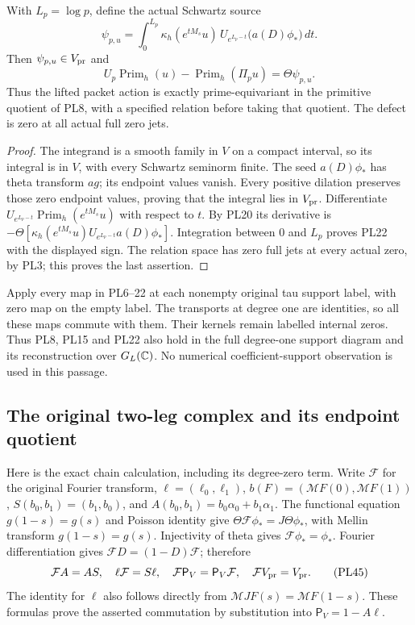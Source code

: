 \begin{theorem}
\label{pl:thm:prime}
With \(L_p=\log p\), define the actual Schwartz source
\[
 \psi_{p,u}=
 \int_0^{L_p}\kappa_h(e^{tM_s}u)\,
       U_{e^{L_p-t}}\bigl(a(D)\phi_*\bigr)\,dt.
 \tag{PL21}\label{pl:pl:duhamel}
\]
Then \(\psi_{p,u}\in V_{\rm pr}\) and
\[
 U_p\operatorname{Prim}_h(u)-\operatorname{Prim}_h(\Pi_pu)
                =\Theta\psi_{p,u}.
 \tag{PL22}\label{pl:pl:prime-defect}
\]
Thus the lifted packet action is exactly prime-equivariant in the
primitive quotient of PL8, with a specified relation before taking
that quotient. The defect is zero at all actual full zero jets.
\end{theorem}
\begin{proof}
The integrand is a smooth family in \(V\) on a compact interval,
so its integral is in \(V\), with every Schwartz seminorm finite.
The seed \(a(D)\phi_*\) has theta transform \(a g\); its endpoint
values vanish. Every positive dilation preserves those zero endpoint
values, proving that the integral lies in \(V_{\rm pr}\).
Differentiate
\(U_{e^{L_p-t}}\operatorname{Prim}_h(e^{tM_s}u)\)
with respect to \(t\). By PL20 its derivative is
\(-\Theta[\kappa_h(e^{tM_s}u)U_{e^{L_p-t}}a(D)\phi_*]\).
Integration between \(0\) and \(L_p\) proves PL22 with the
displayed sign. The relation space has zero full jets at every
actual zero, by PL3; this proves the last assertion.
\end{proof}

Apply every map in PL6--22 at each nonempty original tau support label,
with zero map on the empty label. The transports at degree one are
identities, so all these maps commute with them. Their kernels remain
labelled internal zeros. Thus PL8, PL15 and PL22 also hold in the full
degree-one support diagram and its reconstruction over \(G_L(\mathbb C)\).
No numerical coefficient-support observation is used in this passage.

\subsection{The original two-leg complex and its endpoint quotient}
Here is the exact chain calculation, including its degree-zero term.
Write \(\mathcal F\) for the original Fourier transform,
\(\ell=(\ell_0,\ell_1)\), \(b(F)=(\mathcal M F(0),\mathcal M F(1))\),
\(S(b_0,b_1)=(b_1,b_0)\), and
\(A(b_0,b_1)=b_0\alpha_0+b_1\alpha_1\).
The functional equation \(g(1-s)=g(s)\) and Poisson identity give
\(\Theta\mathcal F\phi_* =J\Theta\phi_*\), with Mellin transform
\(g(1-s)=g(s)\). Injectivity of theta gives
\(\mathcal F\phi_*=\phi_*\). Fourier differentiation gives
\(\mathcal F D=(1-D)\mathcal F\); therefore
\[
 \mathcal F A=AS,\quad \ell\mathcal F=S\ell,\quad
 \mathcal F\mathsf P_V=\mathsf P_V\mathcal F,\quad
 \mathcal F V_{\rm pr}=V_{\rm pr}.
 \tag{PL45}\label{pl:pl:Fourier-projection}
\]
The identity for \(\ell\) also follows directly from
\(\mathcal M JF(s)=\mathcal M F(1-s)\). These formulas prove the asserted
commutation by substitution into \(\mathsf P_V=1-A\ell\).

